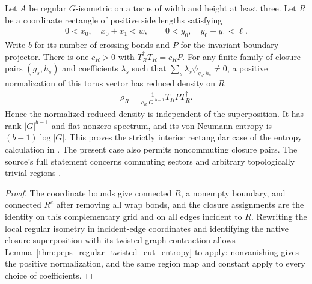 \begin{lemma}%
    \label{thm:peps_regular_torus_interior_rectangle_entropy}
    \leanok
    Let $A$ be regular $G$-isometric on a torus of width and height at
    least three. Let $R$ be a coordinate rectangle of positive side
    lengths satisfying
    \begin{align}
        0<x_0,\quad x_0+x_1<w,\qquad
        0<y_0,\quad y_0+y_1<\ell.
    \end{align}
    Write $b$ for its number of crossing bonds and $P$ for the invariant
    boundary projector. There is one $c_R>0$ with
    $T_R^\dagger T_R=c_RP$. For any finite family of closure pairs
    $(g_s,h_s)$ and coefficients $\lambda_s$ such that
    $\sum_s\lambda_s\psi_{g_s,h_s}\ne0$, a positive normalization of this
    torus vector has reduced density on $R$
    \begin{align}
        \rho_R=\frac{1}{c_R|G|^{b-1}}T_RPT_R^\dagger.
    \end{align}
    Hence the normalized reduced density is independent of the
    superposition. It has rank $|G|^{b-1}$ and flat nonzero spectrum,
    and its von Neumann entropy is $(b-1)\log|G|$.
    This proves the strictly interior rectangular case of the entropy
    calculation in \cite[Theorem~6.9]{Schuch2010PEPS}. The present case
    also permits noncommuting closure pairs. The source's full statement
    concerns commuting sectors and arbitrary topologically trivial
    regions \cite{gap:rmp_peps_quantum_double_g_isometry}.
\end{lemma}

\begin{proof}\leanok
    The coordinate bounds give connected $R$, a nonempty boundary, and
    connected $R^c$ after removing all wrap bonds, and the closure assignments
    are the identity on this complementary grid and on all edges incident
    to $R$. Rewriting the local regular isometry in incident-edge
    coordinates and identifying the native closure superposition with its
    twisted graph contraction allows
    Lemma~\ref{thm:peps_regular_twisted_cut_entropy} to apply: nonvanishing gives
    the positive normalization, and the same region map and constant apply
    to every choice of coefficients.
\end{proof}
